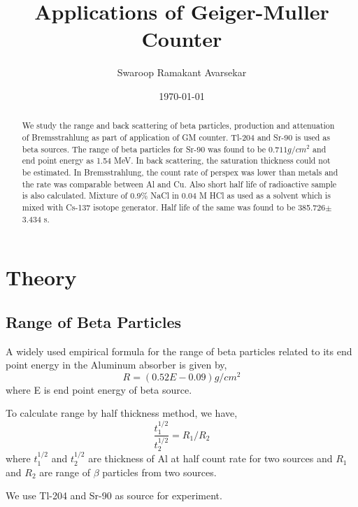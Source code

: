 \documentclass[a4paper, amsfonts, amssymb, amsmath, reprint, showkeys, nofootinbib, twoside]{revtex4-1}
\begin{document}
\title{Applications of Geiger-Muller Counter}
\author{Swaroop Ramakant Avarsekar}
\date{\today}

\begin{abstract}
We study the range and back scattering of beta particles, production and attenuation of Bremsstrahlung as part of application of GM counter. Tl-204 and Sr-90 is used as beta sources. The range of beta particles for Sr-90 was found to be $0.711g/cm^2$ and end point energy as 1.54 MeV. In back scattering, the saturation thickness could not be estimated. In Bremsstrahlung, the count rate of perspex was lower than metals and the rate was comparable between Al and Cu. Also short half life of radioactive sample is also calculated. Mixture of 0.9\% NaCl in 0.04 M HCl as used as a solvent which is mixed with Cs-137 isotope generator. Half life of the same was found to be 385.726$\pm$ 3.434 s. 
\end{abstract}
	
\maketitle
\section{Theory}
\subsection{Range of Beta Particles }
A widely used empirical formula for the range of beta particles related to its end point energy in the Aluminum absorber is given by,
\begin{equation}
	R=(0.52E-0.09) g/cm^2
\end{equation}
where E is end point energy of beta source. 

To calculate range by half thickness method, we have,
\begin{equation}
\frac{t_1^{1/2}}{t_2^{1/2}}=R_1/R_2
\end{equation}
where  $t_1^{1/2}$ and $t_2^{1/2}$ are thickness of Al at half count rate for two sources and $R_1$ and $R_2$ are range of $\beta$ particles from two sources.

We use Tl-204 and Sr-90 as source for experiment.
\end{document}
